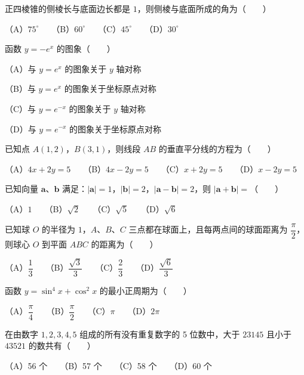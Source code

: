 \begin{question}
正四棱锥的侧棱长与底面边长都是 $1$，则侧棱与底面所成的角为\mbox{（　　）}

（A）$75^\circ$　　（B）$60^\circ$　　（C）$45^\circ$　　（D）$30^\circ$

\end{question}
\begin{question}
函数 $y=-e^x$ 的图象\mbox{（　　）}

（A）与 $y=e^x$ 的图象关于 $y$ 轴对称

（B）与 $y=e^x$ 的图象关于坐标原点对称

（C）与 $y=e^{-x}$ 的图象关于 $y$ 轴对称

（D）与 $y=e^{-x}$ 的图象关于坐标原点对称

\end{question}
\begin{question}
已知点 $A(1,2)$，$B(3,1)$，则线段 $AB$ 的垂直平分线的方程为\mbox{（　　）}

（A）$4x+2y=5$　　（B）$4x-2y=5$　　（C）$x+2y=5$　　（D）$x-2y=5$

\end{question}
\begin{question}
已知向量 $\boldsymbol a\text{、}\boldsymbol b$ 满足：$|\boldsymbol a|=1$，$|\boldsymbol b|=2$，$|\boldsymbol a-\boldsymbol b|=2$，则 $|\boldsymbol a+\boldsymbol b|=$\mbox{（　　）}

（A）$1$　　（B）$\sqrt2$　　（C）$\sqrt5$　　（D）$\sqrt6$

\end{question}
\begin{question}
已知球 $O$ 的半径为 $1$，$A\text{、}B\text{、}C$ 三点都在球面上，且每两点间的球面距离为 $\dfrac\pi2$，则球心 $O$ 到平面 $ABC$ 的距离为\mbox{（　　）}

（A）$\dfrac13$　　（B）$\dfrac{\sqrt3}{3}$　　（C）$\dfrac23$　　（D）$\dfrac{\sqrt6}{3}$

\end{question}
\begin{question}
函数 $y=\sin^4x+\cos^2x$ 的最小正周期为\mbox{（　　）}

（A）$\dfrac\pi4$　　（B）$\dfrac\pi2$　　（C）$\pi$　　（D）$2\pi$

\end{question}
\begin{question}
在由数字 $1,2,3,4,5$ 组成的所有没有重复数字的 5 位数中，大于 $23145$ 且小于 $43521$ 的数共有\mbox{（　　）}

（A）56 个　　（B）57 个　　（C）58 个　　（D）60 个

\end{question}

